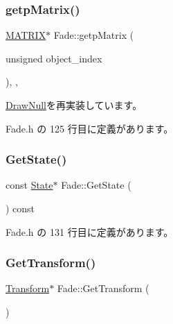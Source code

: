 \subsubsection{\texorpdfstring{getp\+Matrix()}{getpMatrix()}}
{\footnotesize\ttfamily \mbox{\hyperlink{_vector3_d_8h_a032295cd9fb1b711757c90667278e744}{M\+A\+T\+R\+IX}}$\ast$ Fade\+::getp\+Matrix (\begin{DoxyParamCaption}\item[{unsigned}]{object\+\_\+index }\end{DoxyParamCaption})\hspace{0.3cm}{\ttfamily [inline]}, {\ttfamily [override]}, {\ttfamily [virtual]}}



\mbox{\hyperlink{class_draw_null_a001901c340671106a33d44b9d4aef4c4}{Draw\+Null}}を再実装しています。



 Fade.\+h の 125 行目に定義があります。

\mbox{\label{class_fade_aeb41dfcadf75dd4c980da68e243cc310}} 
\subsubsection{\texorpdfstring{Get\+State()}{GetState()}}
{\footnotesize\ttfamily const \mbox{\hyperlink{class_fade_ae77826bf3ff2ab95fb7b3b6f95cba80a}{State}}$\ast$ Fade\+::\+Get\+State (\begin{DoxyParamCaption}{ }\end{DoxyParamCaption}) const\hspace{0.3cm}{\ttfamily [inline]}}



 Fade.\+h の 131 行目に定義があります。

\mbox{\label{class_fade_a1a177209e72a27858ceb2d339321e9c4}} 
\subsubsection{\texorpdfstring{Get\+Transform()}{GetTransform()}}
{\footnotesize\ttfamily \mbox{\hyperlink{class_transform}{Transform}}$\ast$ Fade\+::\+Get\+Transform (\begin{DoxyParamCaption}{ }\end{DoxyParamCaption})\hspace{0.3cm}{\ttfamily [inline]}}




